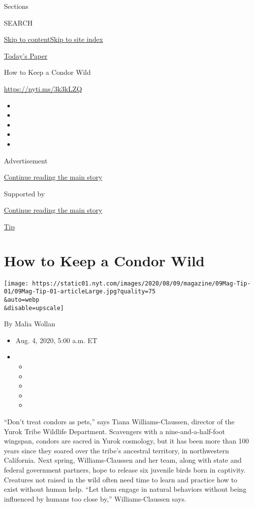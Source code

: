 Sections

SEARCH

\protect\hyperlink{site-content}{Skip to
content}\protect\hyperlink{site-index}{Skip to site index}

\href{https://myaccount.nytimes.com/auth/login?response_type=cookie\&client_id=vi}{}

\href{https://www.nytimes.com/section/todayspaper}{Today's Paper}

How to Keep a Condor Wild

\url{https://nyti.ms/3k3kLZQ}

\begin{itemize}
\item
\item
\item
\item
\item
\end{itemize}

Advertisement

\protect\hyperlink{after-top}{Continue reading the main story}

Supported by

\protect\hyperlink{after-sponsor}{Continue reading the main story}

\href{/column/magazine-tip}{Tip}

\hypertarget{how-to-keep-a-condor-wild}{%
\section{How to Keep a Condor Wild}\label{how-to-keep-a-condor-wild}}

\texttt{[image: https://static01.nyt.com/images/2020/08/09/magazine/09Mag-Tip-01/09Mag-Tip-01-articleLarge.jpg?quality=75\\\&auto=webp\\\&disable=upscale]}

By Malia Wollan

\begin{itemize}
\item
  Aug. 4, 2020, 5:00 a.m. ET
\item
  \begin{itemize}
  \item
  \item
  \item
  \item
  \item
  \end{itemize}
\end{itemize}

``Don't treat condors as pets,'' says Tiana Williams-Claussen, director
of the Yurok Tribe Wildlife Department. Scavengers with a
nine-and-a-half-foot wingspan, condors are sacred in Yurok cosmology,
but it has been more than 100 years since they soared over the tribe's
ancestral territory, in northwestern California. Next spring,
Williams-Claussen and her team, along with state and federal government
partners, hope to release six juvenile birds born in captivity.
Creatures not raised in the wild often need time to learn and practice
how to exist without human help. ``Let them engage in natural behaviors
without being influenced by humans too close by,'' Williams-Claussen
says.


